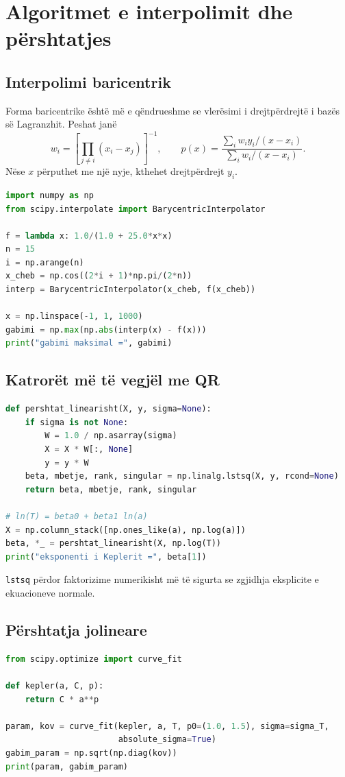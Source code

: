 \section{Algoritmet e interpolimit dhe përshtatjes}
\subsection{Interpolimi baricentrik}
Forma baricentrike është më e qëndrueshme se vlerësimi i drejtpërdrejtë i bazës së Lagranzhit. Peshat janë
\begin{equation}
 w_i=\left[\prod_{j\ne i}(x_i-x_j)\right]^{-1},\qquad
 p(x)=\frac{\sum_iw_iy_i/(x-x_i)}{\sum_iw_i/(x-x_i)}.
\end{equation}
Nëse $x$ përputhet me një nyje, kthehet drejtpërdrejt $y_i$.

\begin{lstlisting}[language=Python,caption={Interpolimi baricentrik nga SciPy.}]
import numpy as np
from scipy.interpolate import BarycentricInterpolator

f = lambda x: 1.0/(1.0 + 25.0*x*x)
n = 15
i = np.arange(n)
x_cheb = np.cos((2*i + 1)*np.pi/(2*n))
interp = BarycentricInterpolator(x_cheb, f(x_cheb))

x = np.linspace(-1, 1, 1000)
gabimi = np.max(np.abs(interp(x) - f(x)))
print("gabimi maksimal =", gabimi)
\end{lstlisting}

\subsection{Katrorët më të vegjël me QR}
\begin{lstlisting}[language=Python,caption={Përshtatja e një modeli linear në parametra.}]
def pershtat_linearisht(X, y, sigma=None):
    if sigma is not None:
        W = 1.0 / np.asarray(sigma)
        X = X * W[:, None]
        y = y * W
    beta, mbetje, rank, singular = np.linalg.lstsq(X, y, rcond=None)
    return beta, mbetje, rank, singular

# ln(T) = beta0 + beta1 ln(a)
X = np.column_stack([np.ones_like(a), np.log(a)])
beta, *_ = pershtat_linearisht(X, np.log(T))
print("eksponenti i Keplerit =", beta[1])
\end{lstlisting}
\texttt{lstsq} përdor faktorizime numerikisht më të sigurta se zgjidhja eksplicite e ekuacioneve normale.

\subsection{Përshtatja jolineare}
\begin{lstlisting}[language=Python,caption={Përshtatja e modelit $T=C a^p$ në shkallën origjinale.}]
from scipy.optimize import curve_fit

def kepler(a, C, p):
    return C * a**p

param, kov = curve_fit(kepler, a, T, p0=(1.0, 1.5), sigma=sigma_T,
                       absolute_sigma=True)
gabim_param = np.sqrt(np.diag(kov))
print(param, gabim_param)
\end{lstlisting}

